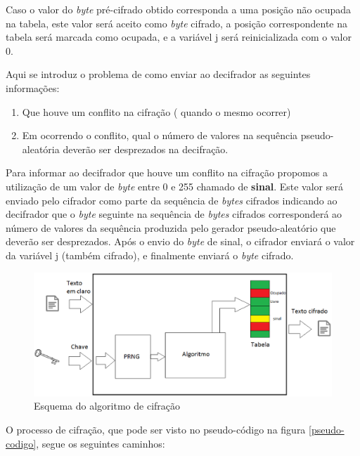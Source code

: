Caso o valor do \textit{byte} pré-cifrado obtido corresponda a uma posição não ocupada na tabela, este valor será aceito como \textit{byte} cifrado, a posição correspondente na tabela será marcada como ocupada, e a variável j será reinicializada com o valor 0.

Aqui se introduz o problema de como enviar ao decifrador as seguintes informações:

\begin{enumerate}
	\item Que houve um conflito na cifração ( quando o mesmo ocorrer)
	\item Em ocorrendo o conflito, qual o número de valores na sequência pseudo-aleatória deverão ser desprezados na decifração.
\end{enumerate}

Para informar ao decifrador que houve um conflito na cifração propomos a utilização de um valor de \textit{byte} entre 0 e 255 chamado de \textbf{sinal}. Este valor será enviado pelo cifrador como parte da sequência de \textit{bytes} cifrados indicando ao decifrador que o \textit{byte} seguinte na sequência de \textit{bytes} cifrados corresponderá ao número de valores da sequência produzida pelo gerador pseudo-aleatório que deverão ser desprezados.  Após o envio do \textit{byte} de sinal, o cifrador  enviará o valor da variável j (também cifrado), e finalmente enviará o \textit{byte} cifrado.

\begin{figure}[h]
	\centering
	\includegraphics[scale=0.6]{figuras/funcionamento.eps}
	\caption{Esquema do algoritmo de cifração}
\end{figure}

O processo de cifração, que pode ser visto no pseudo-código na figura \ref{pseudo-codigo}, segue os seguintes caminhos:

